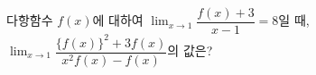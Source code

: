 다항함수 $f(x)$에 대하여 $\displaystyle\lim_{x\to 1}\dfrac{f(x)+3}{x-1}=8$일 때, $\displaystyle\lim_{x\to 1}\dfrac{\{f(x)\}^2+3f(x)}{x^2f(x)-f(x)}$의 값은? 
